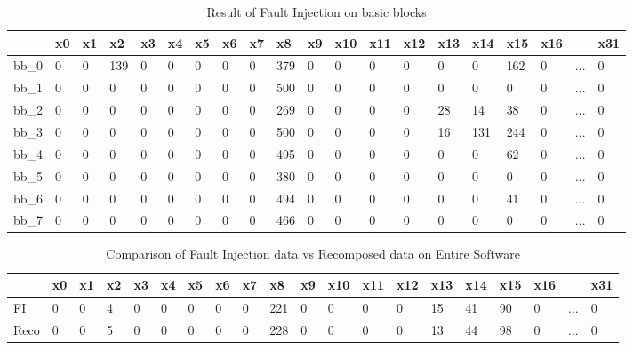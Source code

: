 \documentclass[./dissertation.tex]{subfiles}
\begin{document}
\begin{table}[H]
    \centering
    \caption{Result of Fault Injection on basic blocks}
    \begin{tabular}{|l|l|l|l|l|l|l|l|l|l|l|l|l|l|l|l|l|l|l|l|}
    \hline
        ~ & x0 & x1 & x2 & x3 & x4 & x5 & x6 & x7 & x8 & x9 & x10 & x11 & x12 & x13 & x14 & x15 & x16 & ~ & x31 \\ \hline
        bb\_0 & 0 & 0 & 139 & 0 & 0 & 0 & 0 & 0 & 379 & 0 & 0 & 0 & 0 & 0 & 0 & 162 & 0 & ... & 0 \\ \hline
        bb\_1 & 0 & 0 & 0 & 0 & 0 & 0 & 0 & 0 & 500 & 0 & 0 & 0 & 0 & 0 & 0 & 0 & 0 & ... & 0 \\ \hline
        bb\_2 & 0 & 0 & 0 & 0 & 0 & 0 & 0 & 0 & 269 & 0 & 0 & 0 & 0 & 28 & 14 & 38 & 0 & ... & 0 \\ \hline
        bb\_3 & 0 & 0 & 0 & 0 & 0 & 0 & 0 & 0 & 500 & 0 & 0 & 0 & 0 & 16 & 131 & 244 & 0 & ... & 0 \\ \hline
        bb\_4 & 0 & 0 & 0 & 0 & 0 & 0 & 0 & 0 & 495 & 0 & 0 & 0 & 0 & 0 & 0 & 62 & 0 & ... & 0 \\ \hline
        bb\_5 & 0 & 0 & 0 & 0 & 0 & 0 & 0 & 0 & 380 & 0 & 0 & 0 & 0 & 0 & 0 & 0 & 0 & ... & 0 \\ \hline
        bb\_6 & 0 & 0 & 0 & 0 & 0 & 0 & 0 & 0 & 494 & 0 & 0 & 0 & 0 & 0 & 0 & 41 & 0 & ... & 0 \\ \hline
        bb\_7 & 0 & 0 & 0 & 0 & 0 & 0 & 0 & 0 & 466 & 0 & 0 & 0 & 0 & 0 & 0 & 0 & 0 & ... & 0 \\ \hline
    \end{tabular}
\end{table}

\begin{table}[H]
    \centering
    \caption{Comparison of Fault Injection data vs Recomposed data on Entire Software}
    \begin{tabular}{|l|l|l|l|l|l|l|l|l|l|l|l|l|l|l|l|l|l|l|l|}
    \hline
        ~ & x0 & x1 & x2 & x3 & x4 & x5 & x6 & x7 & x8 & x9 & x10 & x11 & x12 & x13 & x14 & x15 & x16 & ~ & x31 \\ \hline
        FI & 0 & 0 & 4 & 0 & 0 & 0 & 0 & 0 & 221 & 0 & 0 & 0 & 0 & 15 & 41 & 90 & 0 & ... & 0 \\ \hline
        Reco & 0 & 0 & 5 & 0 & 0 & 0 & 0 & 0 & 228 & 0 & 0 & 0 & 0 & 13 & 44 & 98 & 0 & ... & 0 \\ \hline
    \end{tabular}
\end{table}
\end{document}
